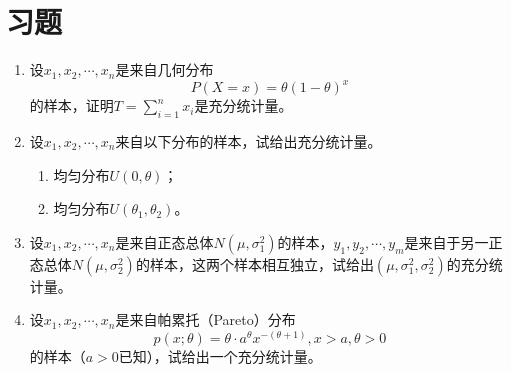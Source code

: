 \section{习题}
\begin{enumerate}
    \item 设$x_1,x_2,\cdots,x_n$是来自几何分布
$$P(X=x) = \theta(1-\theta)^{x}$$
的样本，证明$T = \sum_{i=1}^n x_i$是充分统计量。

\item  设$x_1,x_2,\cdots,x_n$来自以下分布的样本，试给出充分统计量。
\begin{enumerate}
    \item 均匀分布$U(0,\theta)$；
    \item 均匀分布$U(\theta_1,\theta_2)$。
\end{enumerate}

\item 设$x_1,x_2,\cdots,x_n$是来自正态总体$N(\mu,\sigma^2_1)$的样本，$y_1,y_2,\cdots,y_m$是来自于另一正态总体$N(\mu,\sigma^2_2)$的样本，这两个样本相互独立，试给出$(\mu,\sigma_1^2,\sigma_2^2)$的充分统计量。

\item 设$x_1,x_2,\cdots,x_n$是来自帕累托（Pareto）分布
$$
p(x;\theta) = \theta \cdot a^{\theta} x^{-(\theta+1)}, x>a, \theta>0
$$
的样本（$a>0$已知），试给出一个充分统计量。
\end{enumerate}